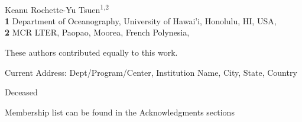 \documentclass[
  10pt,
  letterpaper,
]{article}
\begin{document}
\vspace*{0.2in}

\begin{flushleft}
{\Large
\textbf{} %
}
\newline
\\
Keanu Rochette-Yu Tsuen\textsuperscript{1,2\Yinyang}
\\
\bigskip
\textbf{1} Department of Oceanography, University of
Hawai'i, Honolulu, HI, USA, \\ \textbf{2} MCR
LTER, Paopao, Moorea, French Polynesia, 
\bigskip

% 
%
\Yinyang These authors contributed equally to this work.


\textcurrency Current Address: Dept/Program/Center, Institution Name, City, State, Country %

\dag Deceased

\textpilcrow Membership list can be found in the Acknowledgments
sections


\end{flushleft}
\end{document}
